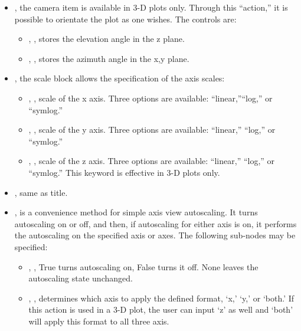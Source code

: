 \begin{itemize}
  \item {}, the camera item is available in 3-D plots only.
  Through this ``action,'' it is possible to orientate the plot as one wishes.
  The controls are:
  \begin{itemize}
    \item {}, , stores the elevation
    angle in the z plane.
    \item {}, , stores the azimuth
    angle in the x,y plane.
  \end{itemize}
  \item {}, the scale block allows the specification of the axis
  scales:
  \begin{itemize}
    \item {}, , scale of the x axis.
    Three options are available: ``linear,''``log,'' or ``symlog.''
    \item {}, , scale of the y axis.
    Three options are available: ``linear,'' ``log,'' or ``symlog.''
    \item {}, , scale of the z axis.
    Three options are available: ``linear,'' ``log,'' or ``symlog.''
    \nb This keyword is effective in 3-D plots only.
  \end{itemize}
  \item {}, same as title.
  \item {}, is a convenience method for simple axis view
  autoscaling.
  It turns autoscaling on or off, and then, if autoscaling for either axis is
  on, it performs the autoscaling on the specified axis or axes.
  The following sub-nodes may be specified:
  \begin{itemize}
    \item {}, , True turns autoscaling
    on, False turns it off.
    None leaves the autoscaling state unchanged.
    \item {}, , determines which axis
    to apply the defined format, `x,' `y,' or `both.'
    \nb If this action is used in a 3-D plot, the user can input `z' as well
    and `both' will apply this format to all three axis.

\end{itemize}
\end{itemize}
